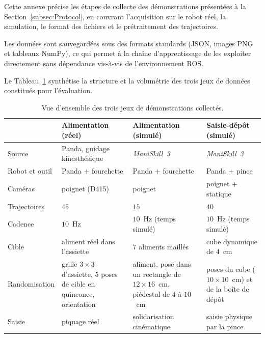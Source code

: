 \label{annexe:data_protocol}

Cette annexe précise les étapes de collecte des démonstrations présentées à la Section~\ref{subsec:Protocol}, en couvrant l'acquisition sur le robot réel, la simulation, le format des fichiers et le prétraitement des trajectoires.

Les données sont sauvegardées sous des formats standards (\ac{JSON}, images PNG et tableaux NumPy), ce qui permet à la chaîne d'apprentissage de les exploiter directement sans dépendance vis-à-vis de l'environnement \ac{ROS}.

Le Tableau~\ref{tab:jeux_donnees} synthétise la structure et la volumétrie des trois jeux de données constitués pour l'évaluation.

\begin{table}[htbp]
\centering
\caption{Vue d'ensemble des trois jeux de démonstrations collectés.}
\label{tab:jeux_donnees}
\small
\begin{tabular}{>{\raggedright\arraybackslash}p{2.6cm}>{\raggedright\arraybackslash}p{3.7cm}>{\raggedright\arraybackslash}p{3.7cm}>{\raggedright\arraybackslash}p{3.7cm}}
\toprule
 & \textbf{Alimentation (réel)} & \textbf{Alimentation (simulé)} & \textbf{Saisie-dépôt (simulé)} \\
\midrule
Source & Panda, guidage kinesthésique & \textit{ManiSkill~3} & \textit{ManiSkill~3} \\ \addlinespace[0.2em]\hline
Robot et outil & Panda + fourchette & Panda + fourchette & Panda + pince \\ \addlinespace[0.2em] \hline
Caméras & poignet (D415) & poignet & poignet + statique \\ \addlinespace[0.2em]\hline
Trajectoires & $45$ & $15$ & $40$ \\ \addlinespace[0.2em] \hline
Cadence & $10$~Hz & $10$~Hz (temps simulé) & $10$~Hz (temps simulé) \\ \addlinespace[0.2em] \hline
Cible & aliment réel dans l'assiette & $7$ aliments maillés & cube dynamique de $4$~cm \\ \addlinespace[0.2em] \hline
Randomisation & grille $3\times3$ d'assiette, $5$ poses de cible en quinconce, orientation & aliment, pose dans un rectangle de $12\times16$~cm, piédestal de $4$ à $10$~cm & poses du cube ($10\times10$~cm) et de la boîte de dépôt \\ \addlinespace[0.2em] \hline
Saisie & piquage réel & solidarisation cinématique & saisie physique par la pince \\
\bottomrule
\end{tabular}
\end{table}

